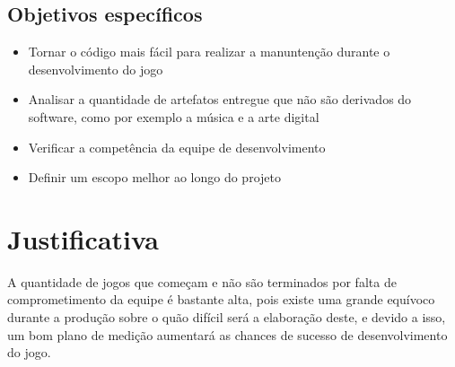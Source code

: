 \subsection{Objetivos específicos}
	\begin{itemize}
		\item Tornar o código mais fácil para realizar a manuntenção durante o desenvolvimento do jogo
		\item Analisar a quantidade de artefatos entregue que não são derivados do software, como por exemplo a música e a arte digital
		\item Verificar a competência da equipe de desenvolvimento
		\item Definir um escopo melhor ao longo do projeto
	\end{itemize}

\section{Justificativa}
	A quantidade de jogos que começam e não são terminados por falta de comprometimento da equipe é bastante alta, pois existe uma grande equívoco durante a produção sobre o quão difícil será a elaboração deste, e devido a isso, um bom plano de medição aumentará as chances de sucesso de desenvolvimento do jogo.
